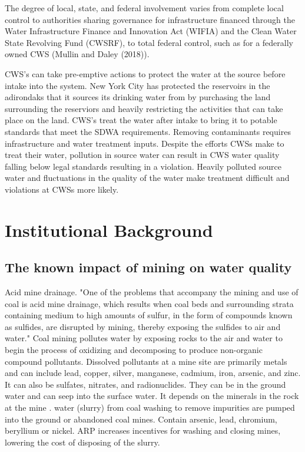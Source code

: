 \documentclass{article}
\begin{document}
The degree of local, state, and federal involvement varies from complete local control to authorities sharing governance for infrastructure financed through the Water Infrastructure Finance and Innovation Act (WIFIA) and the Clean Water State Revolving Fund (CWSRF), to total federal control, such as for a federally owned CWS (Mullin and Daley (2018)). 


CWS's can take pre-emptive actions to protect the water at the source before intake into the system. New York City has protected the reservoirs in the adirondaks that it sources its drinking water from by purchasing the land surrounding the reserviors and heavily restricting the activities that can take place on the land. CWS's treat the water after intake to bring it to potable standards that meet the SDWA requirements. Removing contaminants requires infrastructure and water treatment inputs. Despite the efforts CWSs make to treat their water, pollution in source water can result in CWS water quality falling below legal standards resulting in a violation. Heavily polluted source water and fluctuations in the quality of the water make treatment difficult and violations at CWSs more likely. 


\section{Institutional Background}
\subsection{The known impact of mining on water quality}

Acid mine drainage.
"One of the problems that accompany the mining and use of coal is acid mine drainage, which results when coal beds and surrounding strata containing medium to high amounts of sulfur, in the form of compounds known as sulfides, are disrupted by mining, thereby exposing the sulfides to air and water."\cite{schweinfurth2009introduction} Coal mining pollutes water by exposing rocks to the air and water to begin the process of oxidizing and decomposing to produce non-organic compound pollutants. Dissolved pollutants at a mine site are primarily metals and can include lead, copper, silver, manganese, cadmium, iron, arsenic, and zinc. It can also be sulfates, nitrates, and radionuclides. They can be in the ground water and can seep into the surface water. It depends on the minerals in the rock at the mine \cite{ceto2000abandoned}. \cite{duhigg2009clean} water (slurry) from coal washing to remove impurities are pumped into the ground or abandoned coal mines. Contain arsenic, lead, chromium, beryllium or nickel. ARP increases incentives for washing and closing mines, lowering the cost of disposing of the slurry.
\end{document}
